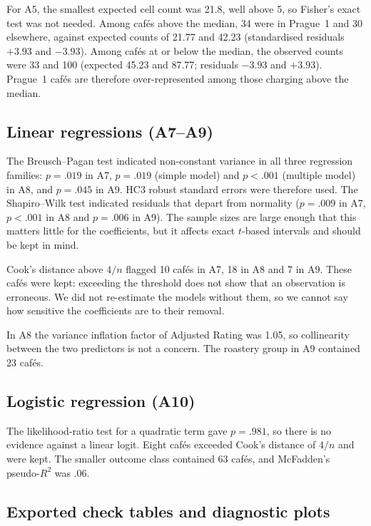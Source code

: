 \documentclass[11pt,a4paper]{article}
\begin{document}
For A5, the smallest expected cell count was 21.8, well above 5, so Fisher's exact test was not needed. Among caf\'es above the median, 34 were in Prague~1 and 30 elsewhere, against expected counts of 21.77 and 42.23 (standardised residuals $+3.93$ and $-3.93$). Among caf\'es at or below the median, the observed counts were 33 and 100 (expected 45.23 and 87.77; residuals $-3.93$ and $+3.93$). Prague~1 caf\'es are therefore over-represented among those charging above the median.

\subsection{Linear regressions (A7--A9)}

The Breusch--Pagan test indicated non-constant variance in all three regression families: $p = .019$ in A7, $p = .019$ (simple model) and $p < .001$ (multiple model) in A8, and $p = .045$ in A9. HC3 robust standard errors were therefore used. The Shapiro--Wilk test indicated residuals that depart from normality ($p = .009$ in A7, $p < .001$ in A8 and $p = .006$ in A9). The sample sizes are large enough that this matters little for the coefficients, but it affects exact $t$-based intervals and should be kept in mind.

Cook's distance above $4/n$ flagged 10 caf\'es in A7, 18 in A8 and 7 in A9. These caf\'es were kept: exceeding the threshold does not show that an observation is erroneous. We did not re-estimate the models without them, so we cannot say how sensitive the coefficients are to their removal.

In A8 the variance inflation factor of Adjusted Rating was 1.05, so collinearity between the two predictors is not a concern. The roastery group in A9 contained 23 caf\'es.

\subsection{Logistic regression (A10)}

The likelihood-ratio test for a quadratic term gave $p = .981$, so there is no evidence against a linear logit. Eight caf\'es exceeded Cook's distance of $4/n$ and were kept. The smaller outcome class contained 63 caf\'es, and McFadden's pseudo-$R^2$ was .06.

\subsection{Exported check tables and diagnostic plots}
\end{document}

